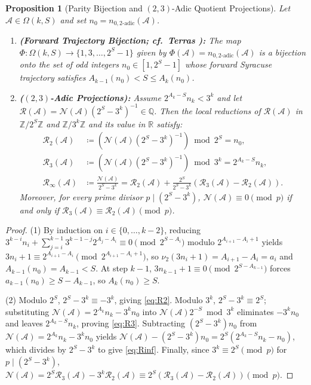 \documentclass[11pt, a4paper]{amsart}
\newtheorem{proposition}[theorem]{Proposition}
\theoremstyle{definition}
\newcommand{\Z}{\mathbb{Z}}
\newcommand{\Q}{\mathbb{Q}}
\newcommand{\R}{\mathbb{R}}
\newcommand{\N}{\mathcal{N}}
\newcommand{\A}{\mathcal{A}}
\newcommand{\Rcal}{\mathcal{R}}
\begin{document}
\begin{proposition}[Parity Bijection and $(2,3)$-Adic Quotient Projections]\label{prop:duality}
Let $\A \in \Omega(k, S)$ and set $n_0 = n_{0,\text{2-adic}}(\A)$.
\begin{enumerate}
    \item \textbf{(Forward Trajectory Bijection; cf.\ Terras \cite{Terras1976}):} The map $\Phi: \Omega(k, S) \to \{1, 3, \dots, 2^S - 1\}$ given by $\Phi(\A) = n_{0,\text{2-adic}}(\A)$ is a bijection onto the set of odd integers $n_0 \in [1, 2^S - 1]$ whose forward Syracuse trajectory satisfies $A_{k-1}(n_0) < S \le A_k(n_0)$.
    \item \textbf{($(2,3)$-Adic Projections):} Assume $2^{A_k - S} n_k < 3^k$ and let $\Rcal(\A) = \N(\A)(2^S - 3^k)^{-1} \in \Q$. Then the local reductions of $\Rcal(\A)$ in $\Z/2^S\Z$ and $\Z/3^k\Z$ and its value in $\R$ satisfy:
    \begin{align}
    \Rcal_2(\A) &\coloneqq \left( \N(\A) (2^S - 3^k)^{-1} \right) \bmod 2^S = n_0, \label{eq:R2} \\
    \Rcal_3(\A) &\coloneqq \left( \N(\A) (2^S - 3^k)^{-1} \right) \bmod 3^k = 2^{A_k - S} n_k, \label{eq:R3} \\
    \Rcal_\infty(\A) &\coloneqq \frac{\N(\A)}{2^S - 3^k} = \Rcal_2(\A) + \frac{2^S}{2^S - 3^k}\left( \Rcal_3(\A) - \Rcal_2(\A) \right). \label{eq:Rinf}
    \end{align}
    Moreover, for every prime divisor $p \mid (2^S - 3^k)$, $\N(\A) \equiv 0 \pmod p$ if and only if $\Rcal_3(\A) \equiv \Rcal_2(\A) \pmod p$.
\end{enumerate}
\end{proposition}

\begin{proof}
(1) By induction on $i \in \{0, \dots, k-2\}$, reducing $3^{k-i} n_i + \sum_{j=i}^{k-1} 3^{k-1-j} 2^{A_j - A_i} \equiv 0 \pmod{2^{S - A_i}}$ modulo $2^{A_{i+1} - A_i + 1}$ yields $3n_i + 1 \equiv 2^{A_{i+1} - A_i} \pmod{2^{A_{i+1} - A_i + 1}}$, so $\nu_2(3n_i + 1) = A_{i+1} - A_i = a_i$ and $A_{k-1}(n_0) = A_{k-1} < S$. At step $k-1$, $3n_{k-1} + 1 \equiv 0 \pmod{2^{S - A_{k-1}}}$ forces $a_{k-1}(n_0) \ge S - A_{k-1}$, so $A_k(n_0) \ge S$.

(2) Modulo $2^S$, $2^S - 3^k \equiv -3^k$, giving \eqref{eq:R2}. Modulo $3^k$, $2^S - 3^k \equiv 2^S$; substituting $\N(\A) = 2^{A_k} n_k - 3^k n_0$ into $\N(\A) 2^{-S} \bmod 3^k$ eliminates $-3^k n_0$ and leaves $2^{A_k - S} n_k$, proving \eqref{eq:R3}. Subtracting $(2^S - 3^k)n_0$ from $\N(\A) = 2^{A_k} n_k - 3^k n_0$ yields $\N(\A) - (2^S - 3^k)n_0 = 2^S(2^{A_k - S}n_k - n_0)$, which divides by $2^S - 3^k$ to give \eqref{eq:Rinf}. Finally, since $3^k \equiv 2^S \pmod p$ for $p \mid (2^S - 3^k)$, $\N(\A) = 2^S \Rcal_3(\A) - 3^k \Rcal_2(\A) \equiv 2^S(\Rcal_3(\A) - \Rcal_2(\A)) \pmod p$.
\end{proof}
\end{document}
